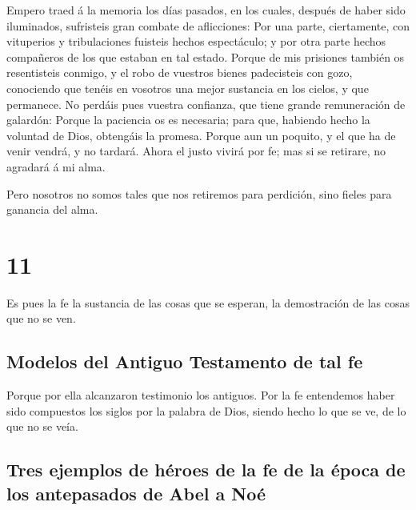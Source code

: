  Empero traed á la memoria los días pasados, en los
cuales, después de haber sido iluminados, sufristeis gran combate de
aflicciones:  Por una parte, ciertamente, con vituperios
y tribulaciones fuisteis hechos espectáculo; y por otra parte hechos
compañeros de los que estaban en tal estado.  Porque de
mis prisiones también os resentisteis conmigo, y el robo de vuestros
bienes padecisteis con gozo, conociendo que tenéis en vosotros una mejor
sustancia en los cielos, y que permanece.  No perdáis
pues vuestra confianza, que tiene grande remuneración de galardón:
 Porque la paciencia os es necesaria; para que, habiendo
hecho la voluntad de Dios, obtengáis la promesa.  Porque
aun un poquito, y el que ha de venir vendrá, y no tardará.
 Ahora el justo vivirá por fe; mas si se retirare, no
agradará á mi alma.

 Pero nosotros no somos tales que nos retiremos para
perdición, sino fieles para ganancia del alma.

\hypertarget{section-58-11}{%
\section{11}\label{section-58-11}}

 Es pues la fe la sustancia de las cosas que se esperan,
la demostración de las cosas que no se ven.

\hypertarget{modelos-del-antiguo-testamento-de-tal-fe}{%
\subsection{Modelos del Antiguo Testamento de tal
fe}\label{modelos-del-antiguo-testamento-de-tal-fe}}

 Porque por ella alcanzaron testimonio los antiguos.
 Por la fe entendemos haber sido compuestos los siglos por
la palabra de Dios, siendo hecho lo que se ve, de lo que no se veía.

\hypertarget{tres-ejemplos-de-huxe9roes-de-la-fe-de-la-uxe9poca-de-los-antepasados-de-abel-a-nouxe9}{%
\subsection{Tres ejemplos de héroes de la fe de la época de los
antepasados \hspace{0pt}\hspace{0pt}de Abel a
Noé}\label{tres-ejemplos-de-huxe9roes-de-la-fe-de-la-uxe9poca-de-los-antepasados-de-abel-a-nouxe9}}

